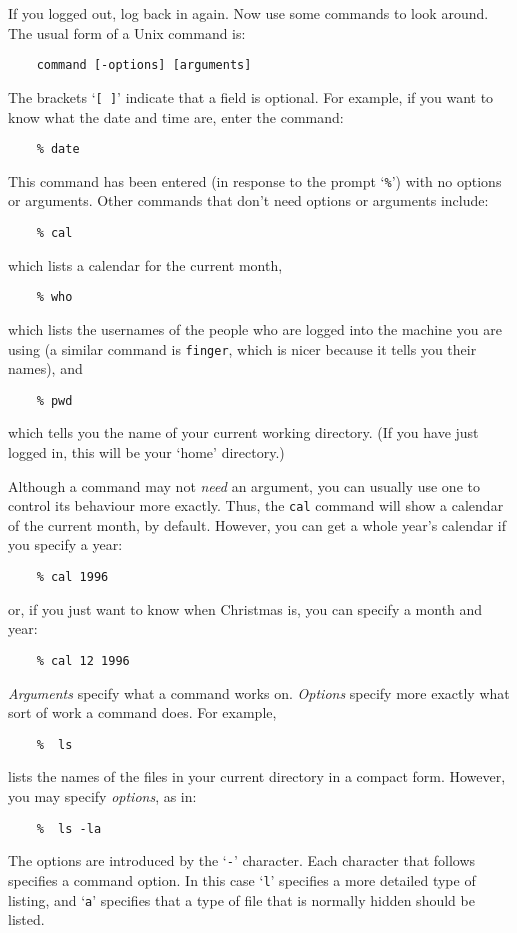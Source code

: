 \documentclass[twoside,11pt]{article}
\begin{document}
If you logged out, log back in again.
Now use some commands to look around.
The usual form of a Unix command is:
\begin{verbatim}
    command [-options] [arguments]
\end{verbatim}
The brackets `{\tt [ ]}' indicate that a field is optional.
For example, if you want to know what the date and time are, enter the command:
\begin{verbatim}
    % date
\end{verbatim}
This command has been entered (in response to the prompt `{\tt \%}') with no
options or arguments.
Other commands that don't need options or arguments include:
\begin{verbatim}
    % cal
\end{verbatim}
which lists a calendar for the current month,
\begin{verbatim}
    % who
\end{verbatim}
which lists the usernames of the people who are logged into the machine you are
using (a similar command is {\tt finger}, which is nicer because it tells you
their names), and
\begin{verbatim}
    % pwd
\end{verbatim}
which tells you the name of your current working directory.
(If you have just logged in, this will be your `home' directory.)

Although a command may not {\em need}\/ an argument, you can usually use one to
control its behaviour more exactly.
Thus, the {\tt cal} command will show a calendar of the current month, by
default.
However, you can get a whole year's calendar if you specify a year:
\begin{verbatim}
    % cal 1996
\end{verbatim}
or, if you just want to know when Christmas is, you can specify a month and
year:
\begin{verbatim}
    % cal 12 1996
\end{verbatim}

{\em Arguments}\/ specify what a command works on.
{\em Options}\/ specify more exactly what sort of work a command does.
For example,
\begin{verbatim}
    %  ls
\end{verbatim}
lists the names of the files in your current directory in a compact form.
However, you may specify {\em options}, as in:
\begin{verbatim}
    %  ls -la
\end{verbatim}
The options are introduced by the `{\tt -}' character.
Each character that follows specifies a command option.
In this case `{\tt l}' specifies a more detailed type of listing, and `{\tt a}'
specifies that a type of file that is normally hidden should be listed.
\end{document}
